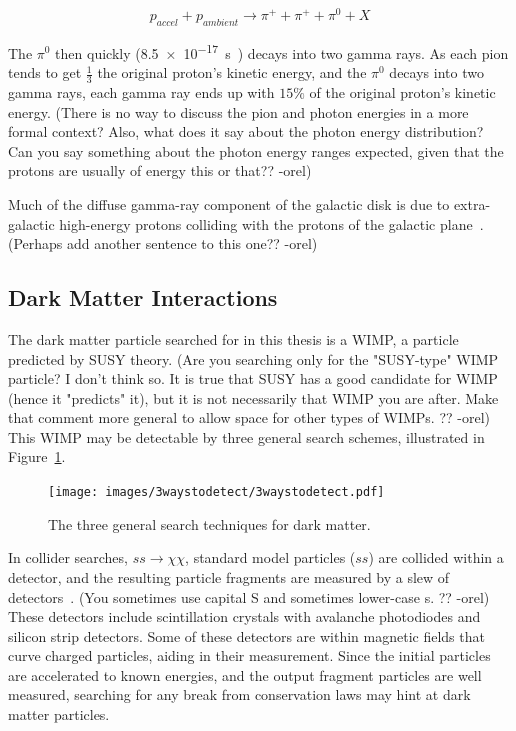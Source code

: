   \begin{equation}\nonumber
    p_{accel} + p_{ambient} \rightarrow \pi^+ + \pi^+ + \pi^0 + X
  \end{equation}

  The $\pi^{0}$ then quickly (\SI{8.5e-17}{s}~\cite{pdg2016}) decays into two gamma rays.
  As each pion tends to get $\frac{1}{3}$ the original proton's kinetic energy, and the $\pi^0$ decays into two gamma rays, each gamma ray ends up with \nicetilde$15\%$ of the original proton's kinetic energy.
  {\color{red}(There is no way to discuss the pion and photon energies in a more formal context? Also, what does it say about the photon energy distribution? Can you say something about the photon energy ranges expected, given that the protons are usually of energy this or that?? -orel)}
  
  Much of the diffuse gamma-ray component of the galactic disk is due to extra-galactic high-energy protons colliding with the protons of the galactic plane~\cite{GalacticDiffuseGammaRays}.
  {\color{red}(Perhaps add another sentence to this one?? -orel)}

  \subsection{Dark Matter Interactions}\label{dmgammaproduction}
    
    The dark matter particle searched for in this thesis is a WIMP, a particle predicted by SUSY theory.
    {\color{red}(Are you searching only for the "SUSY-type" WIMP particle? I don't think so. It is true that SUSY has a good candidate for WIMP (hence it "predicts" it), but it is not necessarily that WIMP you are after. Make that comment more general to allow space for other types of WIMPs. ?? -orel)}
    This WIMP may be detectable by three general search schemes, illustrated in Figure~\ref{fig:3_searches}.

    \begin{figure}[ht]
      \centering
      \texttt{[image: images/3waystodetect/3waystodetect.pdf]}
      \caption[3 Search Techniques]{
        The three general search techniques for dark matter.}
      \label{fig:3_searches}
    \end{figure}
    
    In collider searches, $ss \rightarrow \chi\chi$, standard model particles ($ss$) are collided within a detector, and the resulting particle fragments are measured by a slew of detectors~\cite{atlas,cms}.
    {\color{red}(You sometimes use capital S and sometimes lower-case s. ?? -orel)}
    These detectors include scintillation crystals with avalanche photodiodes and silicon strip detectors.
    Some of these detectors are within magnetic fields that curve charged particles, aiding in their measurement.
    Since the initial particles are accelerated to known energies, and the output fragment particles are well measured, searching for any break from conservation laws may hint at dark matter particles. 
    
